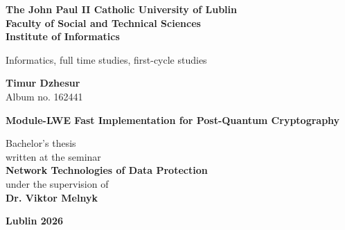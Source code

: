 \documentclass[12pt,a4paper]{report}
\begin{document}
    \begin{titlepage}
        \begin{center}
            \fontsize{14}{17}\selectfont
            \textbf{The John Paul II Catholic University of Lublin} \\
            \textbf{Faculty of Social and Technical Sciences} \\
            \textbf{Institute of Informatics} \\

            \vspace{2.5cm}

            \fontsize{12}{15}\selectfont
            Informatics, full time studies, first-cycle studies \\

            \vspace{3cm}

            \fontsize{14}{17}\selectfont
            \textbf{Timur Dzhesur} \\
            Album no. 162441 \\

            \vspace{2cm}

            \fontsize{16}{20}\selectfont
            \textbf{Module-LWE Fast Implementation for Post-Quantum Cryptography} \\

            \vfill

            \hfill
            \begin{minipage}{0.5\textwidth}
                \fontsize{12}{15}\selectfont
                \begin{flushright}
                    Bachelor's thesis \\
                    written at the seminar \\
                    \textbf{Network Technologies of Data Protection} \\
                    under the supervision of \\
                    \textbf{Dr. Viktor Melnyk}
                \end{flushright}
            \end{minipage}

            \vspace{2cm}

            \fontsize{12}{15}\selectfont
            \textbf{Lublin 2026}
        \end{center}
    \end{titlepage}

    \tableofcontents
    \newpage

    
    
    
    
    
    

    \printbibliography
\end{document}

